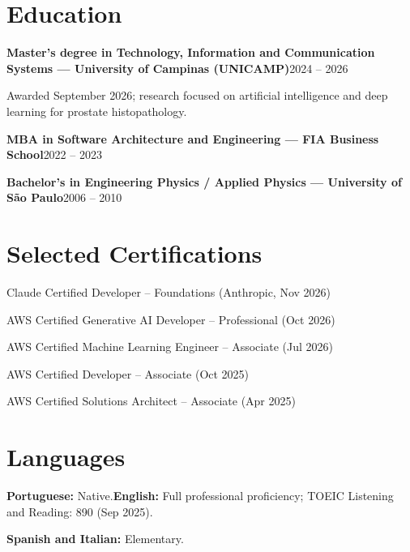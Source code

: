 \documentclass[10pt,a4paper]{article}
\begin{document}
\section{Education}
\textbf{Master's degree in Technology, Information and Communication Systems --- University of Campinas (UNICAMP)}\hfill {\small 2024 -- 2026}\par
Awarded September 2026; research focused on artificial intelligence and deep learning for prostate histopathology.\par
\textbf{MBA in Software Architecture and Engineering --- FIA Business School}\hfill {\small 2022 -- 2023}\par
\textbf{Bachelor's in Engineering Physics / Applied Physics --- University of S\~ao Paulo}\hfill {\small 2006 -- 2010}\par

\section{Selected Certifications}
Claude Certified Developer -- Foundations (Anthropic, Nov 2026)\par
AWS Certified Generative AI Developer -- Professional (Oct 2026)\par
AWS Certified Machine Learning Engineer -- Associate (Jul 2026)\par
AWS Certified Developer -- Associate (Oct 2025)\par
AWS Certified Solutions Architect -- Associate (Apr 2025)

\section{Languages}
\textbf{Portuguese:} Native.\quad\textbf{English:} Full professional proficiency; TOEIC Listening and Reading: 890 (Sep 2025).\par
\textbf{Spanish and Italian:} Elementary.
\end{document}
